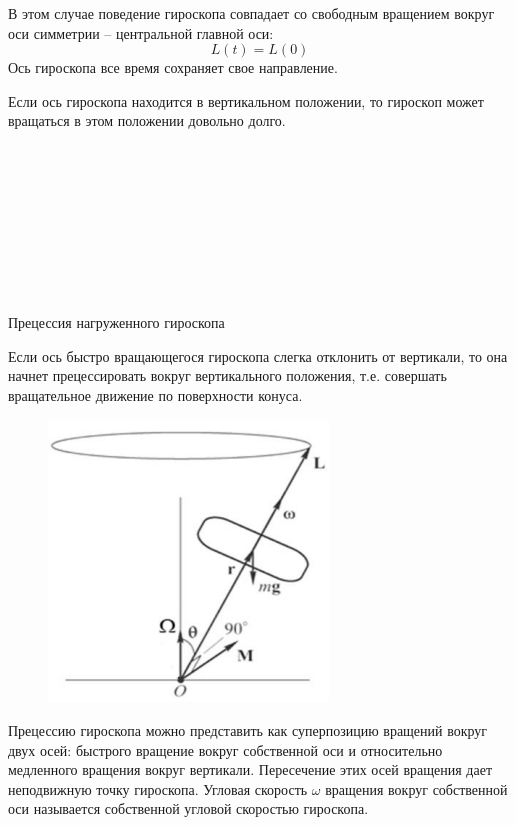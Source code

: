 В этом случае поведение гироскопа 
совпадает со свободным вращением вокруг 
оси симметрии – центральной главной оси:
$$L(t)=L(0)$$
Ось гироскопа все время сохраняет свое 
направление.

Если ось гироскопа находится в вертикальном положении, 
то гироскоп может вращаться в этом положении довольно долго.

\ 

\ 

\ 

\ 

\ 


\begin{definition}
    Прецессия нагруженного гироскопа

    Если ось быстро вращающегося гироскопа слегка отклонить от вертикали, то она
    начнет прецессировать вокруг вертикального положения, т.е. совершать
    вращательное движение по поверхности конуса.
\end{definition}

\begin{figure}
    \centering
    \includegraphics[width=\linewidth]{imgs/q12i2.png}
\end{figure}

    Прецессию гироскопа можно
представить как суперпозицию вращений
вокруг двух осей: быстрого вращение
вокруг собственной оси и относительно
медленного вращения вокруг вертикали.
Пересечение этих осей вращения дает
неподвижную точку гироскопа.
Угловая скорость $\omega$ вращения вокруг
собственной оси называется
собственной угловой скоростью
гироскопа.

